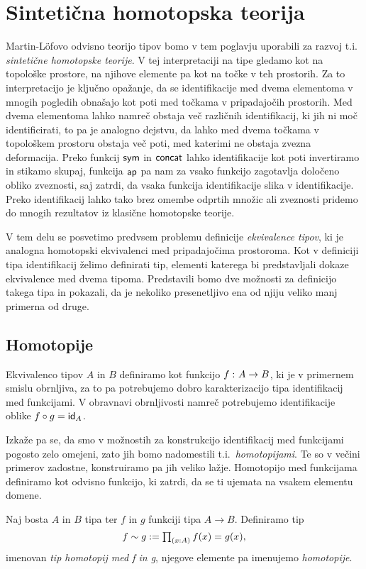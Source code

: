 \section{Sintetična homotopska teorija}
Martin-Löfovo odvisno teorijo tipov bomo v tem poglavju uporabili za razvoj t.i. \emph{sintetične homotopske teorije}. V tej interpretaciji na tipe gledamo kot na topološke prostore, na njihove elemente pa kot na točke v teh prostorih. Za to interpretacijo je ključno opažanje, da se identifikacije med dvema elementoma v mnogih pogledih obnašajo kot poti med točkama v pripadajočih prostorih. Med dvema elementoma lahko namreč obstaja več različnih identifikacij, ki jih ni moč identificirati, to pa je analogno dejstvu, da lahko med dvema točkama v topološkem prostoru obstaja več poti, med katerimi ne obstaja zvezna deformacija. Preko funkcij \(\textnormal{\textsf{sym}}\) in \(\textnormal{\textsf{concat}}\) lahko identifikacije kot poti invertiramo in stikamo skupaj, funkcija \(\textnormal{\textsf{ap}}\) pa nam za vsako funkcijo zagotavlja določeno obliko zveznosti, saj zatrdi, da vsaka funkcija identifikacije slika v identifikacije. Preko identifikacij lahko tako brez omembe odprtih množic ali zveznosti pridemo do mnogih rezultatov iz klasične homotopske teorije.

V tem delu se posvetimo predvsem problemu definicije \emph{ekvivalence tipov}, ki je analogna homotopski ekvivalenci med pripadajočima prostoroma. Kot v definiciji tipa  identifikacij želimo definirati tip, elementi katerega bi predstavljali dokaze ekvivalence med dvema tipoma. Predstavili bomo dve možnosti za definicijo takega tipa in pokazali, da je nekoliko presenetljivo ena od njiju veliko manj primerna od druge.

\subsection{Homotopije}
Ekvivalenco tipov \(A\) in \(B\) definiramo kot funkcijo \(f \,\colon A \to B\), ki
je v primernem smislu obrnljiva, za to pa potrebujemo dobro karakterizacijo tipa identifikacij med funkcijami. V obravnavi obrnljivosti namreč potrebujemo identifikacije oblike \(f \circ g = \textnormal{\textsf{id}}_{A}\).

Izkaže pa se, da smo v možnostih za konstrukcijo identifikacij med funkcijami pogosto zelo omejeni, zato jih bomo nadomestili t.i.~\emph{homotopijami}. Te so v večini primerov zadostne, konstruiramo pa jih veliko lažje. Homotopijo med funkcijama definiramo kot odvisno funkcijo, ki zatrdi, da se ti ujemata na vsakem elementu domene.
\begin{definicija}
  Naj bosta \(A\) in \(B\) tipa ter \(f\) in \(g\) funkciji tipa \(A \to B\). Definiramo tip
  \[f \sim g := \textstyle \prod_{\left( x : A \right)} f(x) = g(x),\]
  imenovan \emph{tip homotopij med f in g}, njegove elemente pa imenujemo \emph{homotopije}.
\end{definicija}

